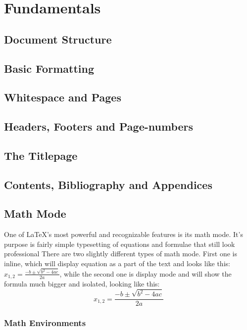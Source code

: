 \section{Fundamentals}

\subsection{Document Structure}


\subsection{Basic Formatting}

\subsection{Whitespace and Pages}


\subsection{Headers, Footers and Page-numbers}

\subsection{The Titlepage}

\subsection{Contents, Bibliography and Appendices}

\subsection{Math Mode}

One of \LaTeX{}'s most powerful and recognizable features is its math mode. It's purpose is fairly simple typesetting of equations and formulae that still look professional There are two slightly different types of math mode. First one is inline, which will display equation as a part of the text and looks like this: $x_{1,2} = \frac{-b\pm \sqrt{b^2-4ac}}{2a}$, while the second one is display mode and will show the formula much bigger and isolated, looking like this: $$x_{1,2} = \frac{-b\pm \sqrt{b^2-4ac}}{2a}$$ %

\subsubsection{Math Environments}
